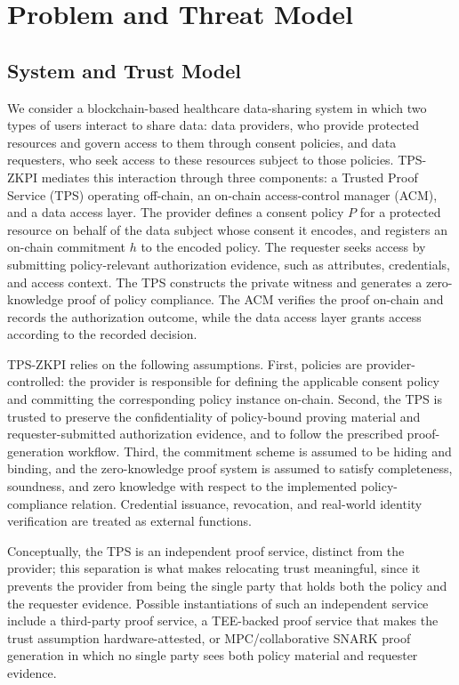 \section{Problem and Threat Model}
\label{sec:problem}

\subsection{System and Trust Model}
\label{subsec:trust-model}

We consider a blockchain-based healthcare data-sharing system in which two types of users interact to share data: data providers, who provide protected resources and govern access to them through consent policies, and data requesters, who seek access to these resources subject to those policies.
TPS-ZKPI mediates this interaction through three components: a Trusted Proof Service (TPS) operating off-chain, an on-chain access-control manager (ACM), and a data access layer.
The provider defines a consent policy $P$ for a protected resource on behalf of the data subject whose consent it encodes, and registers an on-chain commitment $h$ to the encoded policy.
The requester seeks access by submitting policy-relevant authorization evidence, such as attributes, credentials, and access context.
The TPS constructs the private witness and generates a zero-knowledge proof
of policy compliance.
The ACM verifies the proof on-chain and records the authorization outcome, while the data access layer grants access according to the recorded decision.

TPS-ZKPI relies on the following assumptions.
First, policies are provider-controlled: the provider is responsible for defining the applicable consent policy and committing the corresponding policy instance on-chain.
Second, the TPS is trusted to preserve the confidentiality of policy-bound proving material and requester-submitted authorization evidence, and to follow the prescribed proof-generation
workflow.
Third, the commitment scheme is assumed to be hiding and binding, and the zero-knowledge proof system is assumed to satisfy completeness, soundness, and zero knowledge with respect to the implemented policy-compliance relation.
Credential issuance, revocation, and real-world identity verification are treated as
external functions.

Conceptually, the TPS is an independent proof service, distinct from the provider; this
separation is what makes relocating trust meaningful, since it prevents the provider from
being the single party that holds both the policy and the requester evidence. Possible
instantiations of such an independent service include a third-party proof service, a
TEE-backed proof service that makes the trust assumption hardware-attested, or
MPC/collaborative SNARK proof generation in which no single party sees both policy
material and requester evidence.

